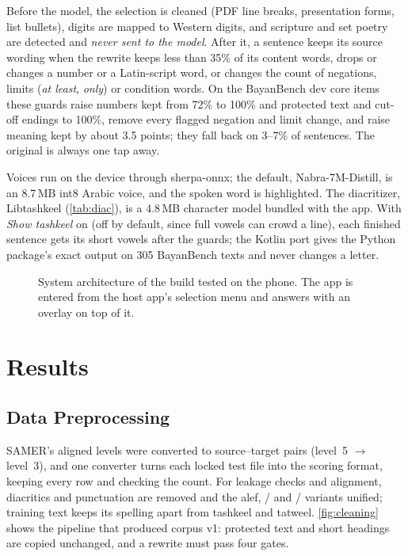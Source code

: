 \documentclass[10pt,a4paper]{article}
\begin{document}
 Before the model, the selection is cleaned (PDF line
breaks, presentation forms, list bullets), digits are mapped to Western digits,
and scripture and set poetry are detected and \emph{never sent to the model}.
After it, a sentence keeps its source wording when the rewrite keeps less than
35\% of its content words, drops or changes a number or a Latin-script word, or
changes the count of negations, limits (\emph{at least}, \emph{only}) or condition
words. On the BayanBench dev core items these guards raise numbers kept from 72\%
to 100\% and protected text and cut-off endings to 100\%, remove every flagged
negation and limit change, and raise meaning kept by about 3.5 points; they fall
back on 3--7\% of sentences. The original is always one tap away.

 Voices run on the device through
sherpa-onnx; the default, Nabra-7M-Distill, is an 8.7\,MB int8 Arabic voice, and
the spoken word is highlighted. The diacritizer, Libtashkeel
(\autoref{tab:diac}), is a 4.8\,MB character model bundled with the app. With
\emph{Show tashkeel} on (off by default, since full vowels can crowd a line), each
finished sentence gets its short vowels after the guards; the Kotlin port gives
the Python package's exact output on 305 BayanBench texts and never changes a
letter.

\begin{figure}[h]
\centering
\figarchitecture
\caption{System architecture of the build tested on the phone. The app is entered
from the host app's selection menu and answers with an overlay on top of it.}
\label{fig:arch}
\end{figure}

\section{Results}

\subsection{Data Preprocessing}
\label{sec:prep}

SAMER's aligned levels were converted to source--target pairs (level~5
$\rightarrow$ level~3), and one converter turns each locked test file into the
scoring format, keeping every row and checking the count. For leakage checks and
alignment, diacritics and punctuation are removed and the alef, / and
/ variants unified; training text keeps its spelling apart from
tashkeel and tatweel. \autoref{fig:cleaning} shows the pipeline that produced
corpus v1: protected text and short headings are copied unchanged, and a rewrite
must pass four gates.
\end{document}
